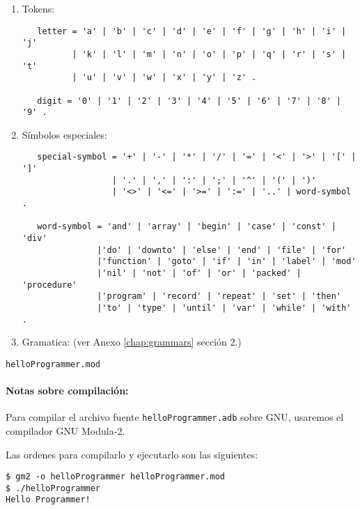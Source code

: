 \begin{enumerate}

\item Tokens:

\begin{verbatim}
   letter = 'a' | 'b' | 'c' | 'd' | 'e' | 'f' | 'g' | 'h' | 'i' | 'j'
          | 'k' | 'l' | 'm' | 'n' | 'o' | 'p' | 'q' | 'r' | 's' | 't'
          | 'u' | 'v' | 'w' | 'x' | 'y' | 'z' .

   digit = '0' | '1' | '2' | '3' | '4' | '5' | '6' | '7' | '8' | '9' .
\end{verbatim}

\item Símbolos especiales:

\begin{verbatim}
   special-symbol = '+' | '-' | '*' | '/' | '=' | '<' | '>' | '[' | ']'
                  | '.' | ',' | ':' | ';' | '^' | '(' | ')'
                  | '<>' | '<=' | '>=' | ':=' | '..' | word-symbol .

   word-symbol = 'and' | 'array' | 'begin' | 'case' | 'const' | 'div'
               |'do' | 'downto' | 'else' | 'end' | 'file' | 'for'
               |'function' | 'goto' | 'if' | 'in' | 'label' | 'mod'
               |'nil' | 'not' | 'of' | 'or' | 'packed' | 'procedure'
               |'program' | 'record' | 'repeat' | 'set' | 'then'
               |'to' | 'type' | 'until' | 'var' | 'while' | 'with' .
\end{verbatim}

\item Gramatica: (ver Anexo \ref{chap:grammars} sección 2.)

\end{enumerate}

\prog \texttt{helloProgrammer.mod}



\paragraph*{Notas sobre compilación:} Para compilar el archivo fuente
\texttt{helloProgrammer.adb} sobre GNU, usaremos el compilador GNU Modula-2. 

Las ordenes para compilarlo y ejecutarlo son las siguientes:

\begin{verbatim}
$ gm2 -o helloProgrammer helloProgrammer.mod
$ ./helloProgrammer 
Hello Programmer!
\end{verbatim}

